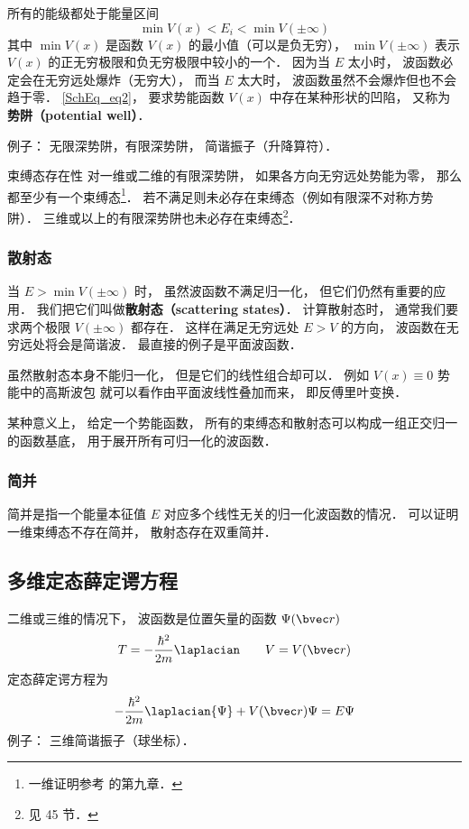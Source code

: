 所有的能级都处于能量区间
\begin{equation}\label{SchEq_eq2}
\min V(x) < E_i < \min V(\pm\infty)
\end{equation}
其中 $\min V(x)$ 是函数 $V(x)$ 的最小值（可以是负无穷）， $\min V(\pm\infty)$ 表示 $V(x)$ 的正无穷极限和负无穷极限中较小的一个． 因为当 $E$ 太小时， 波函数必定会在无穷远处爆炸（无穷大）， 而当 $E$ 太大时， 波函数虽然不会爆炸但也不会趋于零． \autoref{SchEq_eq2}， 要求势能函数 $V(x)$ 中存在某种形状的凹陷， 又称为\textbf{势阱（potential well）}．

例子： 无限深势阱，有限深势阱， 简谐振子（升降算符）．

\begin{theorem}{束缚态存在性}
对一维或二维的有限深势阱， 如果各方向无穷远处势能为零， 那么都至少有一个束缚态\footnote{一维证明参考 \cite{Teschl} 的第九章．}． 若不满足则未必存在束缚态（例如有限深不对称方势阱）． 三维或以上的有限深势阱也未必存在束缚态\footnote{见 \cite{Landau} 45 节．}．
\end{theorem}

\subsubsection{散射态}
当 $E > \min V(\pm\infty)$ 时， 虽然波函数不满足归一化， 但它们仍然有重要的应用． 我们把它们叫做\textbf{散射态（scattering states）}． 计算散射态时， 通常我们要求两个极限 $V(\pm \infty)$ 都存在． 这样在满足无穷远处 $E > V$ 的方向， 波函数在无穷远处将会是简谐波． 最直接的例子是平面波函数． %

虽然散射态本身不能归一化， 但是它们的线性组合却可以． 例如 $V(x) \equiv 0$ 势能中的高斯波包 就可以看作由平面波线性叠加而来， 即反傅里叶变换．

某种意义上， 给定一个势能函数， 所有的束缚态和散射态可以构成一组正交归一的函数基底， 用于展开所有可归一化的波函数．

\subsubsection{简并}
简并是指一个能量本征值 $E$ 对应多个线性无关的归一化波函数的情况． 可以证明一维束缚态不存在简并， 散射态存在双重简并．

\subsection{多维定态薛定谔方程}
二维或三维的情况下， 波函数是位置矢量的函数 $\Psi(\bvec r)$
\begin{equation}
T = -\frac{\hbar^2}{2m} \laplacian \qquad V = V(\bvec r)
\end{equation}
定态薛定谔方程为
\begin{equation}\label{SchEq_eq4}
-\frac{\hbar^2}{2m} \laplacian {\Psi} + V(\bvec r)\Psi = E \Psi
\end{equation}
例子： 三维简谐振子（球坐标）．

